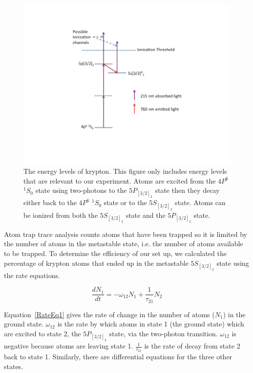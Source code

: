 \documentclass[prb,preprint]{revtex4-1}
\begin{document}
\begin{figure}[h!]
\centering
\includegraphics[width=6in]{KrEnergyLevels.pdf}
\caption{The energy levels of krypton. This figure only includes energy levels that are relevant to our experiment. Atoms are excited from the $4P^6$ $^1S_0$ state using two-photons to the $5P_{[3/2]_2}$ state then they decay either back to the $4P^6$ $^1S_0$ state or to the $5S_{[3/2]_2}$ state. Atoms can be ionized from both the $5S_{[3/2]_2}$ state and the $5P_{[3/2]_2}$ state.}
\label{KrEnergyLevels}
\end{figure}


Atom trap trace analysis counts atoms that have been trapped so it is limited by the number of atoms in the metastable state, i.e. the number of atoms available to be trapped. To determine the efficiency of our set up, we calculated the percentage of krypton atoms that ended up in the metastable $5S_{[3/2]_2}$ state using the rate equations.

\begin{equation}
\label{RateEq1}
\frac{dN_1}{dt} = -\omega_{12}N_1 + \frac{1}{\tau_{21}}N_2
\end{equation}

Equation~\ref{RateEq1} gives the rate of change in the number of atoms ($N_1$) in the ground state. $\omega_{12}$ is the rate by which atoms in state 1 (the ground state) which are excited to state 2, the $5P_{[3/2]_2}$ state, via the two-photon transition. $\omega_{12}$ is negative because atoms are leaving state 1. $\frac{1}{\tau_{21}}$ is the rate of decay from state 2 back to state 1. Similarly, there are differential equations for the three other states.
\end{document}

